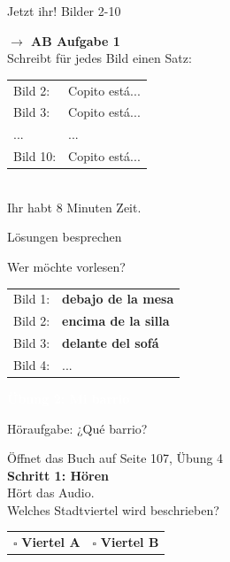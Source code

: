 \documentclass[aspectratio=169,11pt]{beamer}
\newcommand{\es}[1]{\textcolor{spanisch}{\textbf{#1}}}
\newcommand{\phase}[1]{\begin{center}\colorbox{spanisch}{\textcolor{white}{\large\bfseries #1}}\end{center}}
\begin{document}
\begin{frame}{Jetzt ihr! Bilder 2-10}
\begin{center}
{\Large\bfseries $\rightarrow$ AB Aufgabe 1}\\[0.8cm]
{\Large Schreibt für jedes Bild einen Satz:}\\[0.5cm]
\begin{tabular}{ll}
Bild 2: & Copito está... \\[0.4em]
Bild 3: & Copito está... \\[0.4em]
... & ... \\[0.4em]
Bild 10: & Copito está... \\
\end{tabular}
\\[0.8cm]
{\normalsize Ihr habt 8 Minuten Zeit.}
\end{center}
\end{frame}

\begin{frame}{Lösungen besprechen}
\begin{center}
{\Large Wer möchte vorlesen?}\\[1cm]
\begin{tabular}{rl}
Bild 1: & \es{debajo de la mesa} \\[0.4em]
Bild 2: & \es{encima de la silla} \\[0.4em]
Bild 3: & \es{delante del sofá} \\[0.4em]
Bild 4: & ... \\
\end{tabular}
\end{center}
\end{frame}


\begin{frame}{}
\phase{Übung 2: Mi barrio}
\end{frame}

\begin{frame}{Höraufgabe: ¿Qué barrio?}
\begin{center}
{\Large Öffnet das Buch auf Seite 107, Übung 4}\\[1cm]
{\LARGE\bfseries Schritt 1: Hören}\\[0.5cm]
{\Large Hört das Audio.}\\[0.3cm]
{\Large Welches Stadtviertel wird beschrieben?}\\[1cm]
\begin{tabular}{cc}
$\square$ \textbf{Viertel A} & $\square$ \textbf{Viertel B} \\
\end{tabular}
\end{center}
\end{frame}
\end{document}
